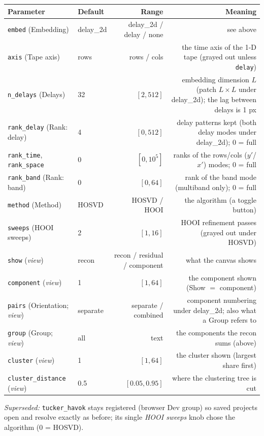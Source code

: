 \documentclass[10pt]{article}
\newcommand{\dev}[1]{\texttt{#1}}
\begin{document}
\begin{longtable}{P l R N}
\toprule Parameter & Default & Range & Meaning \\ \midrule
\texttt{embed} (Embedding) & delay\_2d & delay\_2d / delay / none & see above \\
\texttt{axis} (Tape axis) & rows & rows / cols & the time axis of the 1-D tape (grayed out unless \texttt{delay}) \\
\texttt{n\_delays} (Delays) & 32 & $[2,512]$ & embedding dimension $L$ (patch $L\times L$ under delay\_2d); the lag between delays is 1 px \\
\texttt{rank\_delay} (Rank: delay) & 4 & $[0,512]$ & delay patterns kept (both delay modes under delay\_2d); $0$ = full \\
\texttt{rank\_time}, \texttt{rank\_space} & 0 & $[0,10^5]$ & ranks of the rows/cols ($y'$/$x'$) modes; $0$ = full \\
\texttt{rank\_band} (Rank: band) & 0 & $[0,64]$ & rank of the band mode (multiband only); $0$ = full \\
\texttt{method} (Method) & HOSVD & HOSVD / HOOI & the algorithm (a toggle button) \\
\texttt{sweeps} (HOOI sweeps) & 2 & $[1,16]$ & HOOI refinement passes (grayed out under HOSVD) \\
\texttt{show} (\emph{view}) & recon & recon / residual / component & what the canvas shows \\
\texttt{component} (\emph{view}) & 1 & $[1,64]$ & the component shown (Show $=$ component) \\
\texttt{pairs} (Orientation; \emph{view}) & separate & separate / combined & component numbering under delay\_2d; also what a Group refers to \\
\texttt{group} (Group; \emph{view}) & all & text & the components the recon sums (above) \\
\texttt{cluster} (\emph{view}) & 1 & $[1,64]$ & the cluster shown (largest share first) \\
\texttt{cluster\_distance} (\emph{view}) & 0.5 & $[0.05,0.95]$ & where the clustering tree is cut \\
\bottomrule
\end{longtable}

\emph{Superseded:} \dev{tucker\_havok} stays registered (browser Dev group) so saved projects
open and resolve exactly as before; its single \emph{HOOI sweeps} knob chose the algorithm
($0$ = HOSVD).
\end{document}

